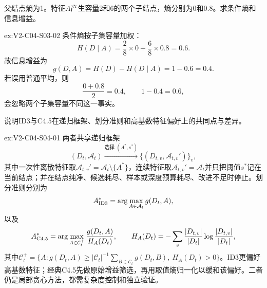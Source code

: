 \begin{SLChapterExercisePairSection}
\begin{exercise}\label{ex:V2-C04-S03-02}
父结点熵为1。特征$A$产生容量2和6的两个子结点，熵分别为0和$0.8$。求条件熵和信息增益。
\end{exercise}
\ifSLFullEdition
{}\label{sol:V2-C04-S03-02}
\begin{chapterexercisesolution}{ex:V2-C04-S03-02}
条件熵按子集容量加权：
\[
H(D\mid A)
=\frac28\times0+\frac68\times0.8
=0.6.
\]
故信息增益为
\[
g(D,A)=H(D)-H(D\mid A)=1-0.6=0.4.
\]
若误用普通平均，则
\[
\frac{0+0.8}{2}=0.4,
\qquad
1-0.4=0.6,
\]
会忽略两个子集容量不同这一事实。
\end{chapterexercisesolution}
\fi

\begin{exercise}\label{ex:V2-C04-S04-01}
说明ID3与C4.5在递归框架、划分准则和高基数特征偏好上的共同点与差异。
\end{exercise}
\ifSLFullEdition
{}\label{sol:V2-C04-S04-01}
\begin{chapterexercisesolution}{ex:V2-C04-S04-01}
两者共享递归框架
\[
(D_t,\mathcal A_t)
\xrightarrow{\text{选择 }(A^*,s^*)}
\{(D_{t,v},\mathcal A_{t,v}')\}_v,
\]
其中一次性离散特征取$\mathcal A_{t,v}'=\mathcal A_t\setminus\{A^*\}$，连续特征取$\mathcal A_{t,v}'=\mathcal A_t$并只把阈值$s^*$记在当前结点；并在结点纯净、候选耗尽、样本或深度预算耗尽、改进不足时停止。划分准则分别为
\[
A^*_{\rm ID3}=\arg\max_{A\in\mathcal A_t}g(D_t,A),
\]
以及
\[
A^*_{\rm C4.5}=\arg\max_{A\in\mathcal C_t^+}
\frac{g(D_t,A)}{H_A(D_t)},
\qquad
H_A(D_t)=-\sum_v\frac{|D_{t,v}|}{|D_t|}\log\frac{|D_{t,v}|}{|D_t|},
\]
其中$\mathcal C_t^+=\{A:g(D_t,A)\geq |\mathcal C_t|^{-1}\sum_{B\in\mathcal C_t}g(D_t,B),\ H_A(D_t)>0\}$。ID3更偏好高基数特征；经典C4.5先做原始增益筛选，再用取值熵归一化以缓和该偏好。二者仍是局部贪心方法，都需复杂度控制和独立验证。
\end{chapterexercisesolution}
\fi


\end{SLChapterExercisePairSection}
